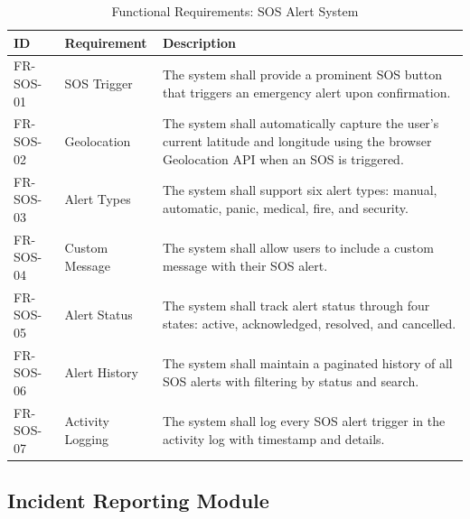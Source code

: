 \begin{table}[H]
  \centering
  \caption{Functional Requirements: SOS Alert System}
  \label{tab:fr-sos}
  \begin{tabularx}{\textwidth}{@{}l l X@{}}
    \toprule
    \textbf{ID} & \textbf{Requirement} & \textbf{Description} \\
    \midrule
    FR-SOS-01 & SOS Trigger & The system shall provide a prominent SOS button that triggers an emergency alert upon confirmation. \\
    FR-SOS-02 & Geolocation & The system shall automatically capture the user's current latitude and longitude using the browser Geolocation API when an SOS is triggered. \\
    FR-SOS-03 & Alert Types & The system shall support six alert types: manual, automatic, panic, medical, fire, and security. \\
    FR-SOS-04 & Custom Message & The system shall allow users to include a custom message with their SOS alert. \\
    FR-SOS-05 & Alert Status & The system shall track alert status through four states: active, acknowledged, resolved, and cancelled. \\
    FR-SOS-06 & Alert History & The system shall maintain a paginated history of all SOS alerts with filtering by status and search. \\
    FR-SOS-07 & Activity Logging & The system shall log every SOS alert trigger in the activity log with timestamp and details. \\
    \bottomrule
  \end{tabularx}
\end{table}

\subsection{Incident Reporting Module}

